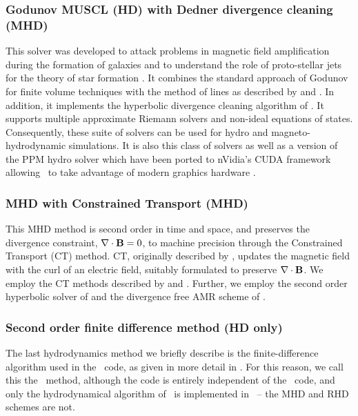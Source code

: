 
\subsubsection{Godunov MUSCL (HD) with Dedner divergence cleaning (MHD)}
This solver was developed to attack problems in magnetic field
amplification during the formation of galaxies \citep{Wang:2009a} and
to understand the role of proto-stellar jets for the theory of star
formation \citep{Wang:2009b}. It combines the standard approach of
Godunov \citep{Godunov1959} for finite volume techniques with the
method of lines as described by \cite{leveque2002finite} and
\cite{toro-1997}. In addition, it implements the hyperbolic divergence
cleaning algorithm of \cite{2002JCoPh.175..645D}. It supports multiple
approximate Riemann solvers and non-ideal equations of
states. Consequently, these suite of solvers can be used for hydro and
magneto-hydrodynamic simulations. It is also this class of solvers as
well as a version of the PPM hydro solver which have been ported to
nVidia's CUDA framework allowing \enzo\ to take advantage of modern
graphics hardware \citep{Wang:2010}.

\subsubsection{MHD with Constrained Transport (MHD)}
This MHD method is second order in time and space, and preserves the
divergence constraint, $\nabla \cdot \mathbf{B} = 0$, to machine precision
through the Constrained Transport (CT) method.  CT, originally
described by \citet{Evans88}, updates the magnetic field with the curl
of an electric field, suitably formulated to preserve $\nabla \cdot
\mathbf{B}$.  We employ the CT methods described by \citet{Balsara99} and
\citet{Gardiner05}.  Further, we employ the second order hyperbolic
solver of \citet{Li08a} and the divergence free AMR scheme of
\citet{Balsara01}.

\subsubsection{Second order finite difference method (HD only)}

The last hydrodynamics method we briefly describe is the
finite-difference algorithm used in the \zeus\ code, as given in more
detail in \citet{Stone92a}.  For this reason, we call this the \zeus\
method, although the code is entirely independent of the \zeus\ code,
and only the hydrodynamical algorithm of \zeus\ is implemented in
\enzo\ -- the MHD and RHD schemes are not.

